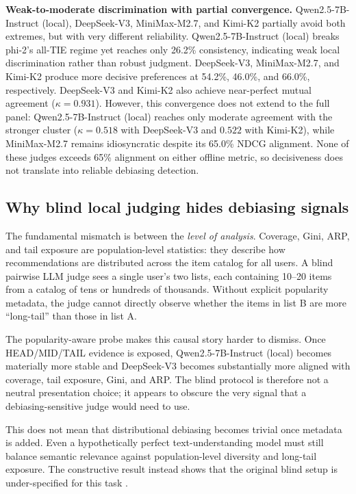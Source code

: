 \documentclass[pdflatex,sn-basic,referee,lineno]{sn-jnl}
\begin{document}
\noindent\textbf{Weak-to-moderate discrimination with partial convergence.}  Qwen2.5-7B-Instruct (local), DeepSeek-V3, MiniMax-M2.7, and Kimi-K2 partially avoid both extremes, but with very different reliability. Qwen2.5-7B-Instruct (local) breaks phi-2's all-TIE regime yet reaches only 26.2\% consistency, indicating weak local discrimination rather than robust judgment. DeepSeek-V3, MiniMax-M2.7, and Kimi-K2 produce more decisive preferences at 54.2\%, 46.0\%, and 66.0\%, respectively. DeepSeek-V3 and Kimi-K2 also achieve near-perfect mutual agreement ($\kappa = 0.931$). However, this convergence does not extend to the full panel: Qwen2.5-7B-Instruct (local) reaches only moderate agreement with the stronger cluster ($\kappa = 0.518$ with DeepSeek-V3 and $0.522$ with Kimi-K2), while MiniMax-M2.7 remains idiosyncratic despite its 65.0\% NDCG alignment. None of these judges exceeds 65\% alignment on either offline metric, so decisiveness does not translate into reliable debiasing detection.

\subsection{Why blind local judging hides debiasing signals}

The fundamental mismatch is between the \emph{level of analysis}. Coverage, Gini, ARP, and tail exposure are population-level statistics: they describe how recommendations are distributed across the item catalog for all users. A blind pairwise LLM judge sees a single user's two lists, each containing 10--20 items from a catalog of tens or hundreds of thousands. Without explicit popularity metadata, the judge cannot directly observe whether the items in list B are more ``long-tail'' than those in list A.

The popularity-aware probe makes this causal story harder to dismiss. Once HEAD/MID/TAIL evidence is exposed, Qwen2.5-7B-Instruct (local) becomes materially more stable and DeepSeek-V3 becomes substantially more aligned with coverage, tail exposure, Gini, and ARP. The blind protocol is therefore not a neutral presentation choice; it appears to obscure the very signal that a debiasing-sensitive judge would need to use.

This does not mean that distributional debiasing becomes trivial once metadata is added. Even a hypothetically perfect text-understanding model must still balance semantic relevance against population-level diversity and long-tail exposure. The constructive result instead shows that the original blind setup is under-specified for this task \citep{mcnee2006being,herlocker2004evaluating}.
\end{document}
